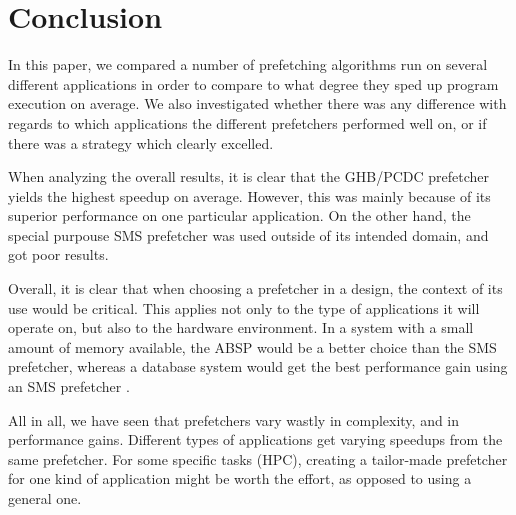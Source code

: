 
\section{Conclusion}
\label{sec:conclusion}

In this paper, we compared a number of prefetching algorithms run on
several different applications in order to compare to what degree they
sped up program execution on average. We also investigated whether
there was any difference with regards to which applications the
different prefetchers performed well on, or if there was a strategy
which clearly excelled.

When analyzing the overall results, it is clear that the GHB/PCDC prefetcher yields the highest speedup on average. However, this was mainly because of its superior performance on one particular application. On the other hand, the special purpouse SMS prefetcher was used outside of its intended domain, and got poor results.  

Overall, it is clear that when choosing a prefetcher in a design, the context of its use would be critical. This applies not only to the type of applications it will operate on, but also to the hardware environment. In a system with a small amount of memory available, the ABSP would be a better choice than the SMS prefetcher, whereas a database system would get the best performance gain using an SMS prefetcher \cite{SMS}. 

All in all, we have seen that prefetchers vary wastly in complexity, and in performance gains. Different types of applications get varying speedups from the same prefetcher. For some specific tasks (HPC), creating a tailor-made prefetcher for one kind of application might be worth the effort, as opposed to using a general one.
